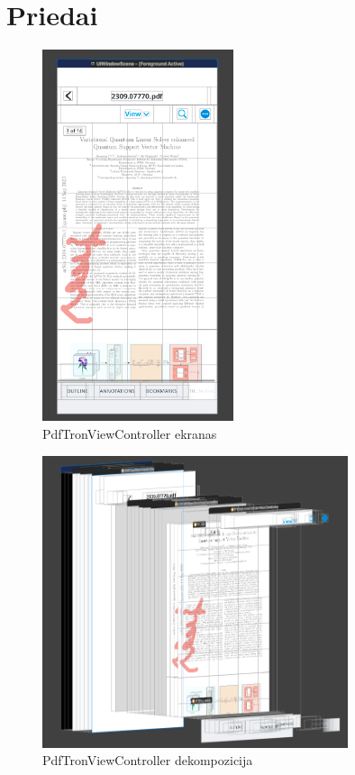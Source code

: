 \documentclass{VUMIFPSPraktika}
\begin{document}
\newpage

\section{Priedai}
\begin{figure}[htbp!]
    \centering
    \includegraphics[width=0.5\textwidth]{Images/PdfTronViewController.png}
    \caption{PdfTronViewController ekranas}
    \label{fig:pdfViewController screen}
\end{figure}

\begin{figure}[htbp!]
    \centering
    \includegraphics[width=0.8\textwidth]{Images/SideViewPdfViewController.png}
    \caption{PdfTronViewController dekompozicija}
    \label{img:pdfViewController}
\end{figure}
\end{document}
